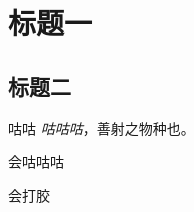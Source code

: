 \documentclass{ctexart}
\begin{document}
\section{标题一}
\subsection{标题二}

\begin{myDefination}{咕咕}
\textit{咕咕咕}，善射之物种也。
\begin{myProperties}
    \item 会咕咕咕
    \item 会打胶
\end{myProperties}


\end{myDefination}
\end{document}
